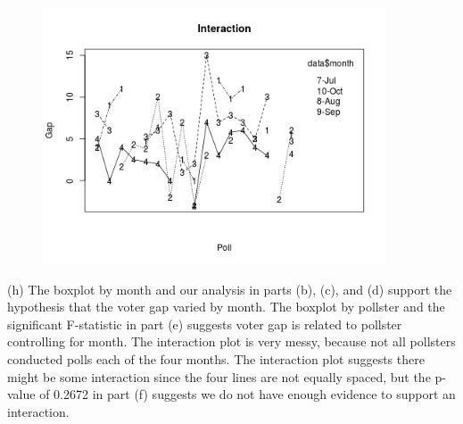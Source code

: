 \documentclass[11pt]{article}
\begin{document}
\begin{figure}[h!]
\includegraphics[width=4in]{interactions.png}
\end{figure}

\pagebreak

\noindent (h) The boxplot by month and our analysis in parts (b), (c), and (d) support the hypothesis that the voter gap varied by month.  The boxplot by pollster and the significant F-statistic in part (e) suggests voter gap is related to pollster controlling for month.  The interaction plot is very messy, because not all pollsters conducted polls each of the four months.  The interaction plot suggests there might be some interaction since the four lines are not equally spaced, but the p-value of 0.2672 in part (f) suggests we do not have enough evidence to support an interaction.
\end{document}

